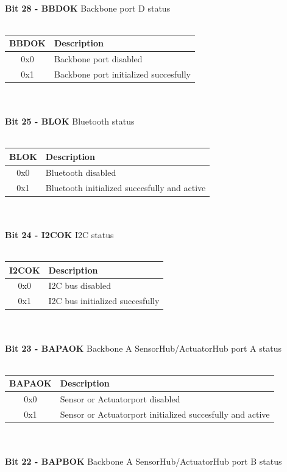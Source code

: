 \pagebreak\\
\textbf{Bit 28 - BBDOK} Backbone port D status\\\\
\begin{tabular}{|c|l|}
    \hline
   BBDOK & Description\\ \hline
   0x0 & Backbone port disabled\\ \hline
   0x1 & Backbone port initialized succesfully \\ \hline
\end{tabular}\\\\
\textbf{Bit 25 - BLOK} Bluetooth status\\\\
\begin{tabular}{|c|l|}
    \hline
   BLOK & Description\\ \hline
   0x0 & Bluetooth disabled\\ \hline
   0x1 & Bluetooth initialized succesfully and active\\ \hline
\end{tabular}\\\\
\textbf{Bit 24 - I2COK} I2C status\\\\
\begin{tabular}{|c|l|}
    \hline
   I2COK & Description\\ \hline
   0x0 & I2C bus disabled\\ \hline
   0x1 & I2C bus initialized succesfully \\ \hline
\end{tabular}\\\\
\textbf{Bit 23 - BAPAOK} Backbone A SensorHub/ActuatorHub port A status\\\\
\begin{tabular}{|c|l|}
    \hline
   BAPAOK & Description\\ \hline
   0x0 & Sensor or Actuatorport disabled\\ \hline
   0x1 & Sensor or Actuatorport initialized succesfully and active\\ \hline
\end{tabular}\\\\
\textbf{Bit 22 - BAPBOK} Backbone A SensorHub/ActuatorHub port B status\\\\

